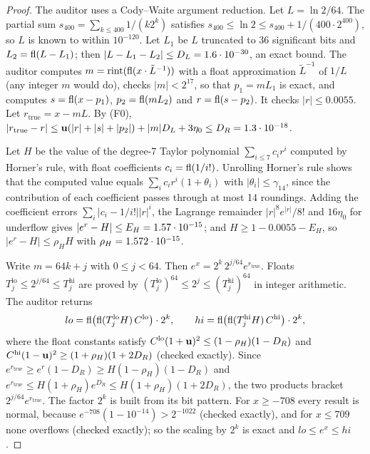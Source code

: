 \begin{proof}
The auditor uses a Cody--Waite argument reduction.
Let $L=\ln2/64$.
The partial sum $s_{400}=\sum_{k\le400}1/(k2^k)$ satisfies $s_{400}\le\ln2\le s_{400}+1/(400\cdot2^{400})$, so $L$ is known to within $10^{-120}$.
Let $L_1$ be $L$ truncated to 36 significant bits and $L_2=\operatorname{fl}(L-L_1)$; then $|L-L_1-L_2|\le D_L=1.6\cdot 10^{-30}$, an exact bound.
The auditor computes $m=\mathrm{rint}(\operatorname{fl}(x\cdot\tilde L^{-1}))$ with a float approximation $\tilde L^{-1}$ of $1/L$ (any integer $m$ would do), checks $|m|<2^{17}$, so that $p_1=mL_1$ is exact, and computes $s=\operatorname{fl}(x-p_1)$, $p_2=\operatorname{fl}(mL_2)$ and $r=\operatorname{fl}(s-p_2)$.
It checks $|r|\le0.0055$.
Let $r_{\mathrm{true}}=x-mL$.
By (F0), $|r_{\mathrm{true}}-r|\le\mathbf{u}(|r|+|s|+|p_2|)+|m|D_L+3\eta_0\le D_R=1.3\cdot 10^{-18}$.

Let $H$ be the value of the degree-7 Taylor polynomial $\sum_{i\le7}c_ir^i$ computed by Horner's rule, with float coefficients $c_i=\operatorname{fl}(1/i!)$.
Unrolling Horner's rule shows that the computed value equals $\sum_ic_ir^i(1+\theta_i)$ with $|\theta_i|\le\gamma_{14}$, since the contribution of each coefficient passes through at most 14 roundings.
Adding the coefficient errors $\sum_i|c_i-1/i!||r|^i$, the Lagrange remainder $|r|^8e^{|r|}/8!$ and $16\eta_0$ for underflow gives $|e^r-H|\le E_H=1.57\cdot 10^{-15}$; and $H\ge1-0.0055-E_H$, so $|e^r-H|\le\rho_HH$ with $\rho_H=1.572\cdot 10^{-15}$.

Write $m=64k+j$ with $0\le j<64$.
Then $e^x=2^k\,2^{j/64}e^{r_{\mathrm{true}}}$.
Floats $T^{\mathrm{lo}}_j\le2^{j/64}\le T^{\mathrm{hi}}_j$ are proved by $(T^{\mathrm{lo}}_j)^{64}\le2^j\le(T^{\mathrm{hi}}_j)^{64}$ in integer arithmetic.
The auditor returns
\begin{equation*}
  lo=\operatorname{fl}\bigl(\operatorname{fl}(T^{\mathrm{lo}}_jH)\,C^{\mathrm{lo}}\bigr)\cdot2^k,\qquad hi=\operatorname{fl}\bigl(\operatorname{fl}(T^{\mathrm{hi}}_jH)\,C^{\mathrm{hi}}\bigr)\cdot2^k,
\end{equation*}
where the float constants satisfy $C^{\mathrm{lo}}(1+\mathbf{u})^2\le(1-\rho_H)(1-D_R)$ and $C^{\mathrm{hi}}(1-\mathbf{u})^2\ge(1+\rho_H)(1+2D_R)$ (checked exactly).
Since $e^{r_{\mathrm{true}}}\ge e^r(1-D_R)\ge H(1-\rho_H)(1-D_R)$ and $e^{r_{\mathrm{true}}}\le H(1+\rho_H)e^{D_R}\le H(1+\rho_H)(1+2D_R)$, the two products bracket $2^{j/64}e^{r_{\mathrm{true}}}$.
The factor $2^k$ is built from its bit pattern.
For $x\ge-708$ every result is normal, because $e^{-708}(1-10^{-14})>2^{-1022}$ (checked exactly), and for $x\le709$ none overflows (checked exactly); so the scaling by $2^k$ is exact and $lo\le e^x\le hi$.
\end{proof}

